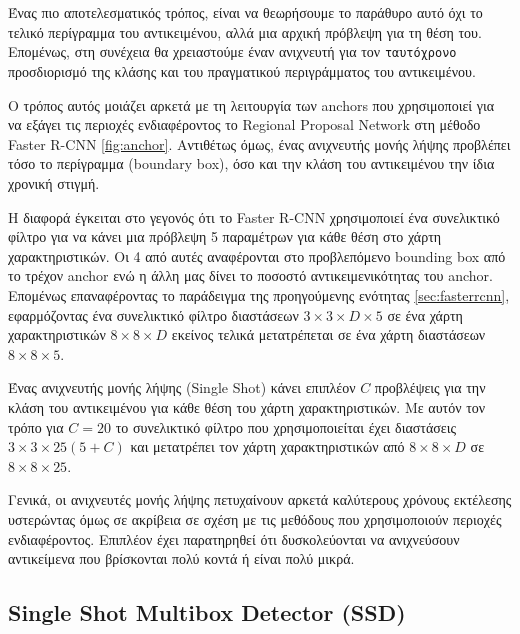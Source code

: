\paragraph{} \hspace{0em} \\
Ένας πιο αποτελεσματικός τρόπος, είναι να θεωρήσουμε το παράθυρο αυτό
όχι το τελικό περίγραμμα του αντικειμένου, αλλά μια αρχική πρόβλεψη για τη θέση του.
Επομένως, στη συνέχεια θα χρειαστούμε έναν ανιχνευτή για τον \texttt{ταυτόχρονο}
προσδιορισμό της κλάσης και του πραγματικού περιγράμματος του αντικειμένου.

Ο τρόπος αυτός μοιάζει αρκετά με τη λειτουργία των anchors που χρησιμοποιεί για να
εξάγει τις περιοχές ενδιαφέροντος το Regional Proposal Network στη μέθοδο Faster R-CNN
\ref{fig:anchor}. Αντιθέτως όμως, ένας ανιχνευτής μονής λήψης προβλέπει τόσο
το περίγραμμα (boundary box), όσο και την κλάση του αντικειμένου την ίδια χρονική
στιγμή.

Η διαφορά έγκειται στο γεγονός ότι το Faster R-CNN χρησιμοποιεί ένα συνελικτικό
φίλτρο για να κάνει μια πρόβλεψη 5 παραμέτρων για κάθε θέση στο χάρτη χαρακτηριστικών.
Οι 4 από αυτές αναφέρονται στο προβλεπόμενο bounding box από το τρέχον anchor ενώ η
άλλη μας δίνει το ποσοστό αντικειμενικότητας του anchor. Επομένως επαναφέροντας το
παράδειγμα της προηγούμενης ενότητας \ref{sec:fasterrcnn}, εφαρμόζοντας ένα συνελικτικό φίλτρο
διαστάσεων $3 \times 3 \times D \times 5$ σε ένα χάρτη χαρακτηριστικών
$8 \times 8 \times D$ εκείνος τελικά μετατρέπεται σε ένα χάρτη διαστάσεων $8 \times 8 \times 5$.

Ένας ανιχνευτής μονής λήψης (Single Shot) κάνει επιπλέον $C$ προβλέψεις για την
κλάση του αντικειμένου για κάθε θέση του χάρτη χαρακτηριστικών. Με αυτόν τον τρόπο
για $C = 20$ το συνελικτικό φίλτρο που χρησιμοποιείται έχει διαστάσεις
$ 3 \times 3 \times 25(5 + C)$ και μετατρέπει τον χάρτη χαρακτηριστικών από $8 \times 8 \times D$
σε $8 \times 8 \times 25$.

Γενικά, οι ανιχνευτές μονής λήψης πετυχαίνουν αρκετά καλύτερους χρόνους εκτέλεσης
υστερώντας όμως σε ακρίβεια σε σχέση με τις μεθόδους που χρησιμοποιούν περιοχές ενδιαφέροντος.
Επιπλέον έχει παρατηρηθεί ότι δυσκολεύονται να ανιχνεύσουν αντικείμενα που βρίσκονται
πολύ κοντά ή είναι πολύ μικρά.

\subsection{Single Shot Multibox Detector (SSD)}\label{sec:ssd}

